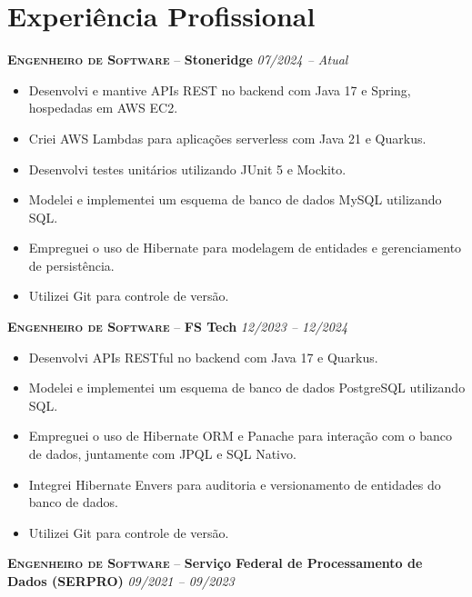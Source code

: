 \documentclass[a4paper,12pt]{article}
\newcommand{\preheadingspacing}{\vspace{6pt}}
\begin{document}
\preheadingspacing

\section{Experiência Profissional}
\vspace{8pt}

\textbf{\textsc{Engenheiro de Software}} -- \textbf{Stoneridge} \hfill \textit{07/2024 -- Atual}

{\small
\begin{itemize}[leftmargin=*,label=\large\textbullet]
    \setlength\itemsep{-0.2em}
    \item Desenvolvi e mantive APIs REST no backend com Java 17 e Spring, hospedadas em AWS EC2.
    \item Criei AWS Lambdas para aplicações serverless com Java 21 e Quarkus.
    \item Desenvolvi testes unitários utilizando JUnit 5 e Mockito.
    \item Modelei e implementei um esquema de banco de dados MySQL utilizando SQL.
    \item Empreguei o uso de Hibernate para modelagem de entidades e gerenciamento de persistência.
    \item Utilizei Git para controle de versão.
\end{itemize}
}

\textbf{\textsc{Engenheiro de Software}} -- \textbf{FS Tech} \hfill \textit{12/2023 -- 12/2024}

{\small
\begin{itemize}[leftmargin=*,label=\large\textbullet]
    \setlength\itemsep{-0.2em}
    \item Desenvolvi APIs RESTful no backend com Java 17 e Quarkus.
    \item Modelei e implementei um esquema de banco de dados PostgreSQL utilizando SQL.
    \item Empreguei o uso de Hibernate ORM e Panache para interação com o banco de dados, juntamente com JPQL e SQL Nativo.
    \item Integrei Hibernate Envers para auditoria e versionamento de entidades do banco de dados.
    \item Utilizei Git para controle de versão.
\end{itemize}
}

\textbf{\textsc{Engenheiro de Software}} -- \textbf{Serviço Federal de Processamento de Dados (SERPRO)} \hfill \textit{09/2021 -- 09/2023}
\end{document}
